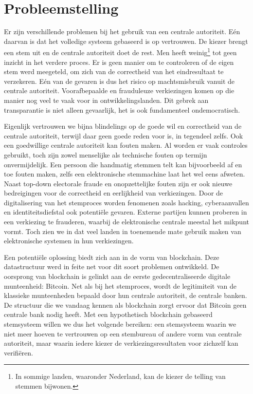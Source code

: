 \section{Probleemstelling}
\label{sec:probleemstelling}
Er zijn verschillende problemen bij het gebruik van een centrale autoriteit. Eén daarvan is dat het volledige systeem gebaseerd is op vertrouwen. De kiezer brengt een stem uit en de centrale autoriteit doet de rest. Men heeft weinig\footnote{In sommige landen, waaronder Nederland, kan de kiezer de telling van stemmen bijwonen.} tot geen inzicht in het verdere proces. Er is geen manier om te controleren of de eigen stem werd meegeteld, om zich van de correctheid van het eindresultaat te verzekeren. Eén van de gevaren is dus het risico op machtsmisbruik vanuit de centrale autoriteit. Voorafbepaalde en frauduleuze verkiezingen komen op die manier nog veel te vaak voor in ontwikkelingslanden. Dit gebrek aan transparantie is niet alleen gevaarlijk, het is ook fundamenteel ondemocratisch.

Eigenlijk vertrouwen we bijna blindelings op de goede wil en correctheid van de centrale autoriteit, terwijl daar geen goede reden voor is, in tegendeel zelfs. Ook een goedwillige centrale autoriteit kan fouten maken. Al worden er vaak controles gebruikt, toch zijn zowel menselijke als technische fouten op termijn onvermijdelijk. Een persoon die handmatig stemmen telt kan bijvoorbeeld af en toe fouten maken, zelfs een elektronische stemmachine laat het wel eens afweten. Naast top-down electorale fraude en onopzettelijke fouten zijn er ook nieuwe bedreigingen voor de correctheid en eerlijkheid van verkiezingen. Door de digitalisering van het stemproces worden fenomenen zoals hacking, cyberaanvallen en identiteitsdiefstal ook potentiële gevaren. Externe partijen kunnen proberen in een verkiezing te frauderen, waarbij de elektronische centrale meestal het mikpunt vormt. Toch zien we in dat veel landen in toenemende mate gebruik maken van elektronische systemen in hun verkiezingen.

Een potentiële oplossing biedt zich aan in de vorm van blockchain. Deze datastructuur werd in feite net voor dit soort problemen ontwikkeld. De oorsprong van blockchain is gelinkt aan de eerste gedecentraliseerde digitale munteenheid:  Bitcoin. Net als bij het stemproces, wordt de legitimiteit van de klassieke munteenheden bepaald door hun centrale autoriteit, de centrale banken. De structuur die we vandaag kennen als blockchain zorgt ervoor dat Bitcoin geen centrale bank nodig heeft. Met een hypothetisch blockchain gebaseerd stemsysteem willen we dus het volgende bereiken: een stemsysteem waarin we niet meer hoeven te vertrouwen op een stembureau of andere vorm van centrale autoriteit, maar waarin iedere kiezer de verkiezingsresultaten voor zichzelf kan verifiëren.

